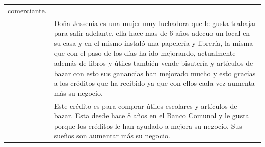 \begin{longtable}{|p{}|p{}|}
	comerciante.                                                                                                                                                    \\
	                                                & Doña Jessenia es una mujer muy luchadora que le gusta trabajar para
	salir adelante, ella hace mas de 6 años adecuo un local en su casa y en
	el mismo instaló una papelería y librería, la misma que con el paso de
	los días ha ido mejorando, actualmente además de libros y útiles también
	vende bisutería y artículos de bazar con esto sus ganancias han mejorado
	mucho y esto gracias a los créditos que ha recibido ya que con ellos
	cada vez aumenta más su negocio.                                                                                                                                \\
	                                                & Este crédito es para comprar útiles escolares y artículos de bazar.
	Esta desde hace 8 años en el Banco Comunal y le gusta porque los
	créditos le han ayudado a mejora su negocio. Sus sueños son aumentar más
	su negocio.                                                                                                                                                     \\
\end{longtable}


